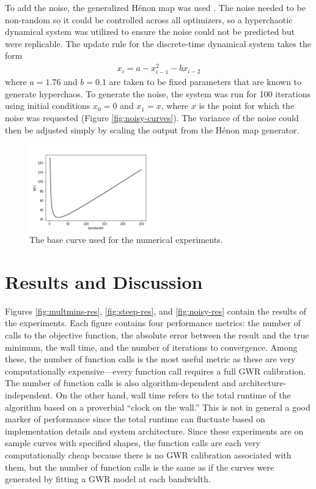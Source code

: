 \documentclass[letterpaper,12pt,twocolumn]{article}
\begin{document}
To add the noise, the generalized Hénon map was used \cite{Henon1976}. The noise needed to be non-random so it could be controlled across all optimizers, so a hyperchaotic dynamical system was utilized to ensure the noise could not be predicted but were replicable. The update rule for the discrete-time dynamical system takes the form \begin{align*}
    x_i = a - x_{i-1}^2 - bx_{i-2}
\end{align*} where $a = 1.76$ and $b = 0.1$ are taken to be fixed parameters that are known to generate hyperchaos. To generate the noise, the system was run for 100 iterations using initial conditions $x_0 = 0$ and $x_1 = x$, where $x$ is the point for which the noise was requested (Figure \ref{fig:noisy-curves}). The variance of the noise could then be adjusted simply by scaling the output from the Hénon map generator.

\begin{figure}
    \centering
    \includegraphics[width=0.5\textwidth]{../figures/baseline.png} 
    \caption{The base curve used for the numerical experiments.}
    \label{fig:baseline}
\end{figure}

\section{Results and Discussion}
\label{sec:results}
Figures \ref{fig:multmins-res}, \ref{fig:steep-res}, and \ref{fig:noisy-res} contain the results of the experiments. Each figure contains four performance metrics: the number of calls to the objective function, the absolute error between the result and the true minimum, the wall time, and the number of iterations to convergence. Among these, the number of function calls is the most useful metric as these are very computationally expensive---every function call requires a full GWR calibration. The number of function calls is also algorithm-dependent and architecture-independent. On the other hand, wall time refers to the total runtime of the algorithm based on a proverbial ``clock on the wall.'' This is not in general a good marker of performance since the total runtime can fluctuate based on implementation details and system architecture. Since these experiments are on sample curves with specified shapes, the function calls are each very computationally cheap because there is no GWR calibration associated with them, but the number of function calls is the same as if the curves were generated by fitting a GWR model at each bandwidth.
\end{document}
